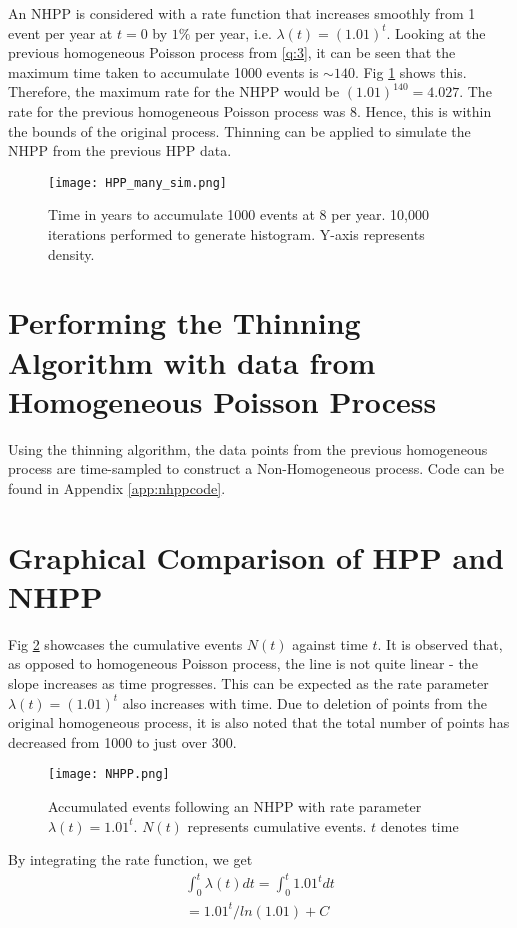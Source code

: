 \documentclass[%
 reprint,
 amsmath,amssymb,
 aps,
]{revtex4-2}
\theoremstyle{definition}
\begin{document}
An NHPP is considered with a rate function that increases smoothly from 1 event per year at $t = 0$ by $1\%$ per year, i.e. $\lambda(t) = (1.01)^t$. Looking at the previous homogeneous Poisson process from \ref{q:3}, it can be seen that the maximum time taken to accumulate 1000 events is $\sim140$. Fig \ref{fig:hpp_many_sim} shows this. Therefore, the maximum rate for the NHPP would be $(1.01)^{140} = 4.027$. The rate for the previous homogeneous Poisson process was 8. Hence, this is within the bounds of the original process. Thinning can be applied to simulate the NHPP from the previous HPP data.

\begin{figure}
\centering
\texttt{[image: HPP\_many\_sim.png]}
\caption{\label{fig:hpp_many_sim}Time in years to accumulate 1000 events at 8 per year. 10,000 iterations performed to generate histogram. Y-axis represents density.}
\end{figure}

\section{\label{q:5}Performing the Thinning Algorithm with data from Homogeneous Poisson Process}
Using the thinning algorithm, the data points from the previous homogeneous process are time-sampled to construct a Non-Homogeneous process. Code can be found in Appendix \ref{app:nhppcode}.

\section{\label{q:6}Graphical Comparison of HPP and NHPP}
Fig \ref{fig:nhpp} showcases the cumulative events $N(t)$ against time $t$. It is observed that, as opposed to homogeneous Poisson process, the line is not quite linear - the slope increases as time progresses. This can be expected as the rate parameter $\lambda(t) = (1.01)^t$ also increases with time. Due to deletion of points from the original homogeneous process, it is also noted that the total number of points has decreased from 1000 to just over 300.

\begin{figure}
\centering
\texttt{[image: NHPP.png]}
\caption{\label{fig:nhpp}Accumulated events following an NHPP with rate parameter $\lambda(t) = 1.01^t$. $N(t)$ represents cumulative events. $t$ denotes time}
\end{figure}

By integrating the rate function, we get 
\begin{gather*}
\int_{0}^{t}\lambda(t)dt = \int_{0}^{t}1.01^tdt\\
=1.01^t/ln(1.01) + C
\end{gather*}
\end{document}
